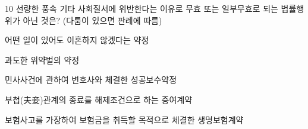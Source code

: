 \begin{question}{10}
선량한 풍속 기타 사회질서에 위반한다는 이유로 무효 또는 일부무효로 되는 법률행위가 아닌 것은? (다툼이 있으면 판례에 따름)
\begin{choices}
  \item 어떤 일이 있어도 이혼하지 않겠다는 약정
  \item 과도한 위약벌의 약정
  \item 민사사건에 관하여 변호사와 체결한 성공보수약정
  \item 부첩(夫妾)관계의 종료를 해제조건으로 하는 증여계약
  \item 보험사고를 가장하여 보험금을 취득할 목적으로 체결한 생명보험계약
\end{choices}
\end{question}
